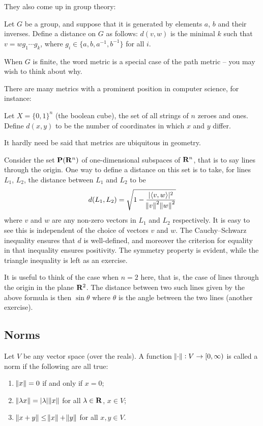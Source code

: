 They also come up in group theory:

\begin{example}
Let $G$ be a group, and suppose that it is generated by elements $a$, $b$ and their inverses. Define a distance on $G$ as follows: $d(v,w)$ is the minimal $k$ such that $v=wg_1\cdots g_k$, where $g_i\in\{a,b,a^{-1},b^{-1}\}$ for all $i$.

When $G$ is finite, the word metric is a special case of the path metric -- you may
wish to think about why.
\end{example}

There are many metrics with a prominent position in computer science, for instance:

\begin{example}
Let $X=\{0,1\}^n$ (the boolean cube), the set of all strings of $n$ zeroes and ones. Define $d(x,y)$ to be the number of coordinates
in which $x$ and $y$ differ.
\end{example}

It hardly need be said that metrics are ubiquitous in geometry.

\begin{example}
Consider the set $\mathbf P(\mathbf R^n)$ of one-dimensional subspaces of $\mathbf R^n$, that is to say lines through the origin. One way to define a distance on this set is to take, for lines $L_1$, $L_2$, the distance between $L_1$ and $L_2$ to be
\[d(L_1,L_2)=\sqrt{1-\frac{|\langle v,w\rangle|^2}{\norm{v}^2\norm{w}^2}}\]
where $v$ and $w$ are any non-zero vectors in $L_1$ and $L_2$ respectively. It is easy to see this is independent of the choice of vectors $v$ and $w$. The Cauchy--Schwarz inequality ensures that $d$ is well-defined, and moreover the criterion for equality in that inequality ensures positivity. The symmetry property is evident, while the triangle inequality is left as an exercise.

It is useful to think of the case when $n=2$ here, that is, the case of lines through the origin in the plane $\mathbf R^2$. The distance between two such lines given by the above formula is then $\sin\theta$ where $\theta$ is the angle between the two lines (another exercise).
\end{example}

\subsection{Norms}
\begin{definition}[Norms]
Let $V$ be any vector space (over the reals). A function $\norm{\cdot}:V\to[0,\infty)$ is called a norm if the following are all true:
\begin{enumerate}[label=(\arabic*)]
\item $\norm{x}=0$ if and only if $x=0$;
\item $\norm{\lambda x}=|\lambda|\norm{x}$ for all $\lambda\in\mathbf R$, $x\in V$;
\item $\norm{x+y}\le\norm{x}+\norm{y}$ for all $x,y\in V$.
\end{enumerate}
\end{definition}

